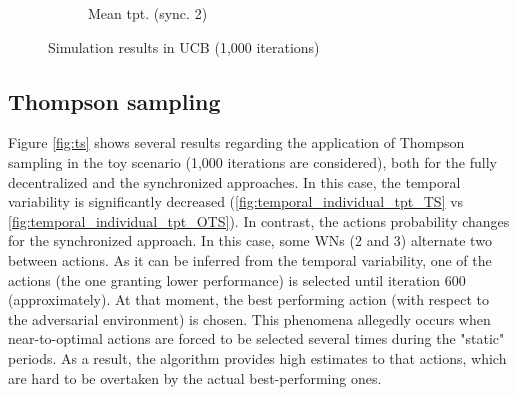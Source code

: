 \documentclass[preprint,12pt]{article}
\begin{document}
\begin{figure}[h!]
\begin{subfigure}[b]{.3\textwidth}
		\caption{Mean tpt. (sync. 2)}\label{fig:mean_tpt_CUCB}
	\end{subfigure}
	\caption{Simulation results in UCB (1,000 iterations)}
	\label{fig:ucb}
\end{figure}

\subsection{Thompson sampling}
\label{section:ts}

Figure \ref{fig:ts} shows several results regarding the application of Thompson sampling in the toy scenario (1,000 iterations are considered), both for the fully decentralized and the synchronized approaches. In this case, the temporal variability is significantly decreased (\ref{fig:temporal_individual_tpt_TS} vs \ref{fig:temporal_individual_tpt_OTS}). In contrast, the actions probability changes for the synchronized approach. In this case, some WNs (2 and 3) alternate two between actions. As it can be inferred from the temporal variability, one of the actions (the one granting lower performance) is selected until iteration 600 (approximately). At that moment, the best performing action (with respect to the adversarial environment) is chosen. This phenomena allegedly occurs when near-to-optimal actions are forced to be selected several times during the "static" periods. As a result, the algorithm provides high estimates to that actions, which are hard to be overtaken by the actual best-performing ones.
\end{document}
